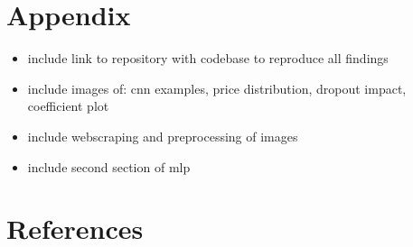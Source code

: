 \documentclass[12pt, letterpaper]{article}
\begin{document}

\section{Appendix}
\begin{itemize}
    \item include link to repository with codebase to reproduce all findings
    \item include images of: cnn examples, price distribution, dropout impact, coefficient plot
    \item include webscraping and preprocessing of images
    \item include second section of mlp
\end{itemize}


\section{References}
\end{document}

